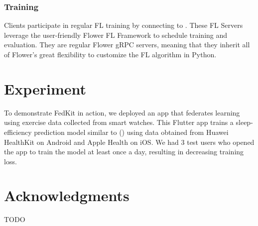 \documentclass[letterpaper]{article} %
\begin{document}
\subsubsection{Training}
Clients participate in regular FL training by connecting to \fs.
These FL Servers leverage the user-friendly Flower FL Framework to
schedule training and evaluation.
They are regular Flower gRPC servers, meaning that
they inherit all of Flower's great flexibility to customize the FL algorithm in
Python.

\section{Experiment}
To demonstrate FedKit in action,
we deployed an app that federates learning using exercise data collected from
smart watches.
This Flutter app trains a sleep-efficiency prediction model similar to ()
using data obtained from Huawei HealthKit
on Android and Apple Health on iOS.
We had 3 test users who opened the app to train the model at least once a day,
resulting in decreasing training loss.

\appendix

\section*{Acknowledgments}
TODO

\bigskip


\end{document}
